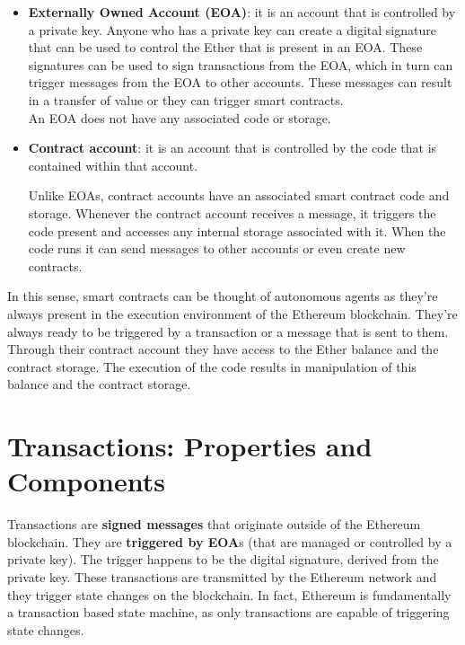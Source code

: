 \begin{itemize}
    
    \item\textbf{Externally Owned Account (EOA)}: it is an account that is controlled by a private key.
    Anyone who has a private key can create a digital signature that can be used to control the Ether that is present in an EOA.
    These signatures can be used to sign transactions from the EOA, which in turn can trigger messages from the EOA to other accounts.
    These messages can result in a transfer of value or they can trigger smart contracts.\\

    An EOA does not have any associated code or storage.

    \item\textbf{Contract account}: it is an account that is controlled by the code that is contained within that account.
    
    Unlike EOAs, contract accounts have an associated smart contract code and storage.
    Whenever the contract account receives a message, it triggers the code present and accesses any internal storage associated with it.
    When the code runs it can send messages to other accounts or even create new contracts.

\end{itemize}

In this sense, smart contracts can be thought of autonomous agents as they're always present in the execution environment of the Ethereum blockchain.
They're always ready to be triggered by a transaction or a message that is sent to them.
Through their contract account they have access to the Ether balance and the contract storage.
The execution of the code results in manipulation of this balance and the contract storage.

\section{Transactions: Properties and Components}

Transactions are \textbf{signed messages} that originate outside of the Ethereum blockchain.
They are \textbf{triggered by EOA}s (that are managed or controlled by a private key).
The trigger happens to be the digital signature, derived from the private key.
These transactions are transmitted by the Ethereum network and they trigger state changes on the blockchain.
In fact, Ethereum is fundamentally a transaction based state machine, as only transactions are capable of triggering state changes.


